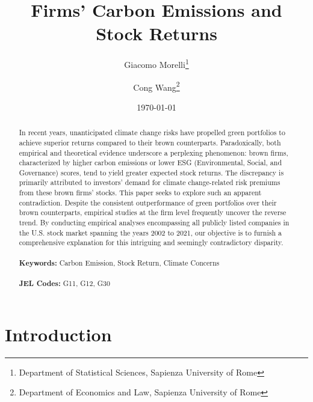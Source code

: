 \documentclass[12pt]{article}
\begin{document}
\begin{titlepage}
\title{Firms' Carbon Emissions and Stock Returns}
\author{Giacomo Morelli\thanks{Department of Statistical Sciences, Sapienza University of Rome} \and 
Cong Wang\thanks{Department of Economics and Law, Sapienza University of Rome}}
\date{\today}
\maketitle
\begin{abstract}
\noindent In recent years, unanticipated climate change risks have propelled green portfolios to achieve superior returns compared to their brown counterparts. Paradoxically, both empirical and theoretical evidence underscore a perplexing phenomenon: brown firms, characterized by higher carbon emissions or lower ESG (Environmental, Social, and Governance) scores, tend to yield greater expected stock returns. The discrepancy is primarily attributed to investors' demand for climate change-related risk premiums from these brown firms' stocks. This paper seeks to explore such an apparent contradiction. Despite the consistent outperformance of green portfolios over their brown counterparts, empirical studies at the firm level frequently uncover the reverse trend. By conducting empirical analyses encompassing all publicly listed companies in the U.S. stock market spanning the years 2002 to 2021, our objective is to furnish a comprehensive explanation for this intriguing and seemingly contradictory disparity.
\\
\vspace{0in}\\
\noindent\textbf{Keywords:} Carbon Emission, Stock Return, Climate Concerns\\
\vspace{0in}\\
\noindent\textbf{JEL Codes:} G11, G12, G30\\
\bigskip
\end{abstract}
\setcounter{page}{0}
\thispagestyle{empty}
\end{titlepage}
\pagebreak \newpage

\doublespacing

\section{Introduction} \label{sec:introduction}
\end{document}
